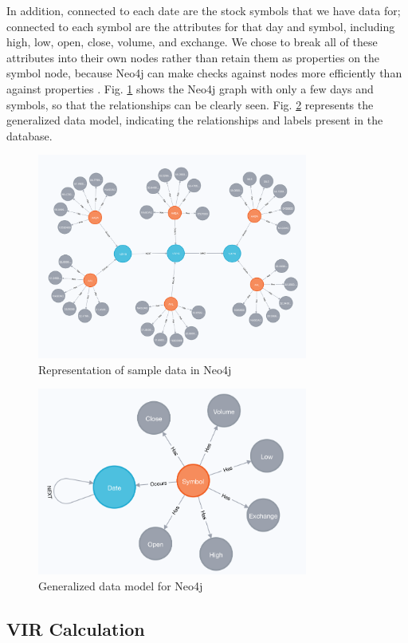 \documentclass{IEEEtran}
\begin{document}
In addition, connected to each date are the stock symbols that we have data for; connected to each symbol are the attributes for that day and symbol, including high, low, open, close, volume, and exchange. We chose to break all of these attributes into their own nodes rather than retain them as properties on the symbol node, because Neo4j can make checks against nodes more efficiently than against properties \cite{neo4j-book}. Fig. \ref{fig:neo4j_model} shows the Neo4j graph with only a few days and symbols, so that the relationships can be clearly seen. Fig. \ref{fig:neo4j_gen_model} represents the generalized data model, indicating the relationships and labels present in the database. 

\begin{figure}
	\centering
	\includegraphics[width=3.5in]{Images/neo4j_data_model.png}
	\caption{Representation of sample data in Neo4j}
	\label{fig:neo4j_model}
\end{figure}

\begin{figure}
	\centering
	\includegraphics[width=3.5in]{Images/neo4j_general_model.png}
	\caption{Generalized data model for Neo4j}
	\label{fig:neo4j_gen_model}
\end{figure}

\subsection{VIR Calculation}
\end{document}
